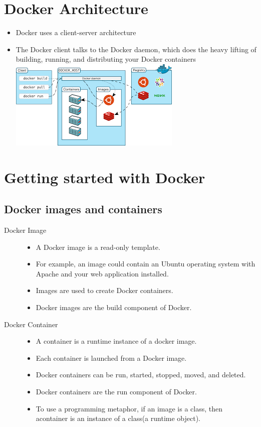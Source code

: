 \documentclass[11pt]{article}
\begin{document}
\section{Docker Architecture}
\label{sec:orgheadline3}
\begin{itemize}
\item Docker uses a client-server architecture
\item The Docker client talks to the Docker daemon, which does the heavy lifting
of building, running, and distributing your Docker containers
\includegraphics[width=.9\linewidth]{./images/architecture.png}
\end{itemize}
\section{Getting started with Docker}
\label{sec:orgheadline20}
\subsection{Docker images and containers}
\label{sec:orgheadline6}
\begin{description}
\item[{Docker Image}] \begin{itemize}
\item A Docker image is a read-only template.
\item For example, an image could contain an Ubuntu operating system with Apache
and your web application installed.
\item Images are used to create Docker containers.
\item Docker images are the build component of Docker.
\end{itemize}
\item[{Docker Container}] \begin{itemize}
\item A container is a runtime instance of a docker image.
\item Each container is launched from a Docker image.
\item Docker containers can be run, started, stopped, moved, and deleted.
\item Docker containers are the run component of Docker.
\item To use a programming metaphor, if an image is a class, then acontainer is
an instance of a class(a runtime object).
\end{itemize}
\end{description}
\end{document}

